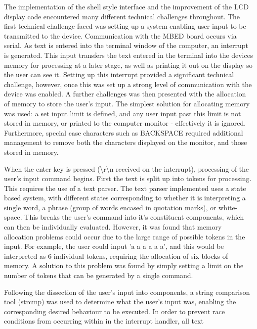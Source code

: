 The implementation of the shell style interface and the improvement of the LCD 
display code encountered many different technical challenges throughout. 
The first technical challenge faced was setting up a system enabling user input 
to be transmitted to the device. 
Communication with the MBED board occurs via serial. As text is entered into the 
terminal window of the computer, an interrupt is generated. This input transfers 
the text entered in the terminal into the devices memory for processing at a 
later stage, as well as printing it out on the display so the user can see it. 
Setting up this interrupt provided a significant technical challenge, however, 
once this was set up a strong level of communication with the device was enabled. 
A further challenges was then presented with the allocation of memory to store the 
user's input. 
The simplest solution for allocating memory was used: a set input limit is 
defined, and any user input past this limit is not stored in memory, or printed 
to the computer monitor - effectively it is ignored. 
Furthermore, special case characters such as BACKSPACE required additional 
management to remove both the characters displayed on the monitor, and those 
stored in memory. 
\par\bigskip\noindent
When the enter key is pressed (\textbackslash r\textbackslash n received on 
the interrupt), processing of the user's input command begins. 
First the text is split up into tokens for processing. This 
requires the use of a text parser. The text parser implemented uses a state 
based system, with different states corresponding to whether it is interpreting 
a single word, a phrase (group of words encased in quotation marks), or 
white-space. This breaks the user's command into it's constituent components, 
which can then be individually evaluated. However, it was found that memory 
allocation problems could occur due to the large range of possible tokens in 
the input. For example, the user could input 'a a a a a a', and this would be 
interpreted as 6 individual tokens, requiring the allocation of six blocks of 
memory. A solution to this problem was found by simply setting a limit on the 
number of tokens that can be generated by a single command. 
\par\bigskip\noindent
Following the dissection of the user's input into components, a string 
comparison tool (strcmp) was used to determine what the user's input was, 
enabling the corresponding desired behaviour to be executed. In order to 
prevent race conditions from occurring within in the interrupt handler, all text 
